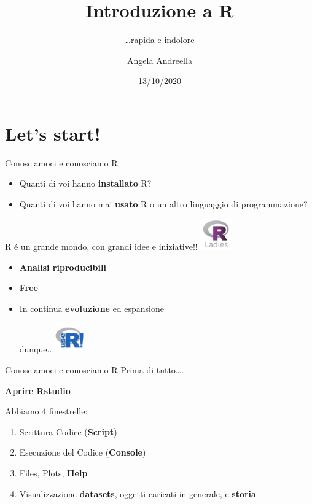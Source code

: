 \documentclass[
  ignorenonframetext,
]{beamer}
\title{Introduzione a R}
\subtitle{\ldots rapida e indolore}
\author{Angela Andreella}
\date{13/10/2020}
\begin{document}
\frame{\titlepage}

\hypertarget{lets-start}{%
\section{Let's start!}\label{lets-start}}

\begin{frame}{Conosciamoci e conosciamo R}
\protect\hypertarget{conosciamoci-e-conosciamo-r}{}
\begin{itemize}
\item
  Quanti di voi hanno \textbf{installato} R?
\item
  Quanti di voi hanno mai \textbf{usato} R o un altro linguaggio di
  programmazione?
\end{itemize}

R é un grande mondo, con grandi idee e iniziative!!
\includegraphics[width=0.1\textwidth,height=\textheight]{Images/R-LadiesGlobal.png}

\begin{itemize}
\item
  \textbf{Analisi riproducibili}
\item
  \textbf{Free}
\item
  In continua \textbf{evoluzione} ed espansione

  dunque..
  \includegraphics[width=0.1\textwidth,height=\textheight]{Images/download.png}
\end{itemize}
\end{frame}

\begin{frame}{Conosciamoci e conosciamo R}
\protect\hypertarget{conosciamoci-e-conosciamo-r-1}{}
Prima di tutto\ldots.

\textbf{Aprire Rstudio}

Abbiamo 4 finestrelle:

\begin{enumerate}
\item
  Scrittura Codice (\textbf{Script})
\item
  Esecuzione del Codice (\textbf{Console})
\item
  Files, Plots, \textbf{Help}
\item
  Visualizzazione \textbf{datasets}, oggetti caricati in generale, e
  \textbf{storia}
\end{enumerate}
\end{frame}
\end{document}
